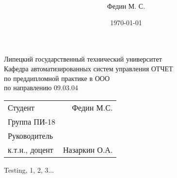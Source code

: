 \documentclass{beamer}
\title{
}
\subtitle{
}
\author{Федин М. С.}
\institute{}
\date{\today}
\begin{document}
\begin{frame}
    \begin{center}
        Липецкий государственный технический университет\\
        Кафедра автоматизированных систем управления
        \vfill
        ОТЧЕТ\\
        по преддипломной практике в ООО \\
        по направлению 09.03.04 \\
    \end{center}
    \vfill
    \begin{tabularx}{\textwidth}{LR}
        Студент & Федин М.С. \\
        Группа ПИ-18 & \\
        Руководитель & \\
        к.т.н., доцент & Назаркин О.А.
    \end{tabularx}
\end{frame}

    \begin{frame}
        Testing, 1, 2, 3...
    \end{frame}
\end{document}
